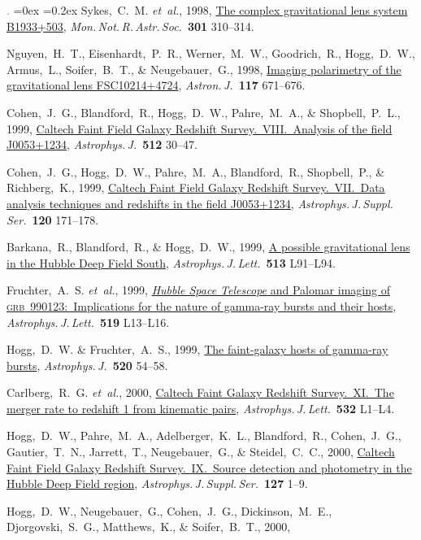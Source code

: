 \documentclass[12pt,letterpaper]{article}
\newcommand{\latin}[1]{\textsl{#1}}
\newcommand{\etal}{\latin{et~al.}}
\newcommand{\satellite}[1]{\textsl{#1}}
\newcommand{\doi}[2]{\href{http://dx.doi.org/#1}{{#2}}}
\newcommand{\deemph}[1]{\textcolor{grey}{\footnotesize{#1}}}
\newcommand{\pubnumber}[1]{\deemph{{#1}.}}
\newcounter{refpubnum}
\newcommand{\hogglist}{%
    \rightmargin=0in
    \leftmargin=0.18in
    \topsep=0ex
    \partopsep=0pt
    \itemsep=0.2ex
    \parsep=0pt
    \itemindent=-1.0\leftmargin
    \listparindent=0.0\leftmargin
    \settowidth{\labelsep}{~}
    \usecounter{refpubnum}
  }
\begin{document}
\begin{list}{\pubnumber{\therefpubnum}}{\hogglist}
Sykes,~C.~M. \etal, 1998,
\doi{10.1046/j.1365-8711.1998.02081.x}{The complex gravitational lens system B1933+503},
\textit{Mon.\,Not.\,R.\,Astr.\,Soc.}\ \textbf{301} 310--314.
\item
Nguyen,~H.~T., Eisenhardt,~P.~R., Werner,~M.~W., Goodrich,~R., Hogg,~D.~W., Armus,~L., Soifer,~B.~T., \& Neugebauer,~G., 1998,
\doi{10.1086/300742}{Imaging polarimetry of the gravitational lens FSC10214+4724},
\textit{Astron.\,J.}\ \textbf{117} 671--676.
\item
Cohen,~J.~G., Blandford,~R., Hogg,~D.~W., Pahre,~M.~A., \& Shopbell,~P.~L., 1999,
\doi{10.1086/306778}{Caltech Faint Field Galaxy Redshift Survey.\ VIII.\ Analysis of the field J0053+1234},
\textit{Astrophys.\,J.}\ \textbf{512} 30--47.
\item
Cohen,~J.~G., Hogg,~D.~W., Pahre,~M.~A., Blandford,~R., Shopbell,~P., \& Richberg,~K., 1999,
\doi{10.1086/313184}{Caltech Faint Field Galaxy Redshift Survey.\ VII.\ Data analysis techniques and redshifts in the field J0053+1234},
\textit{Astrophys.\,J.\,Suppl.\,Ser.}\ \textbf{120} 171--178.
\item
Barkana,~R., Blandford,~R., \& Hogg,~D.~W., 1999,
\doi{10.1086/311924}{A possible gravitational lens in the Hubble Deep Field South},
\textit{Astrophys.\,J.\,Lett.}\ \textbf{513} L91--L94.
\item
Fruchter,~A.~S. \etal, 1999,
\doi{10.1086/312094}{\satellite{Hubble Space Telescope} and Palomar imaging of \textsc{grb}~990123:\ Implications for the nature of gamma-ray bursts and their hosts},
\textit{Astrophys.\,J.\,Lett.}\ \textbf{519} L13--L16.
\item
Hogg,~D.~W. \& Fruchter,~A.~S., 1999,
\doi{10.1086/307457}{The faint-galaxy hosts of gamma-ray bursts},
\textit{Astrophys.\,J.}\ \textbf{520} 54--58.
\item
Carlberg,~R.~G. \etal, 2000,
\doi{10.1086/312560}{Caltech Faint Galaxy Redshift Survey.\ XI.\ The merger rate to redshift 1 from kinematic pairs},
\textit{Astrophys.\,J.\,Lett.}\ \textbf{532} L1--L4.
\item
Hogg,~D.~W., Pahre,~M.~A., Adelberger,~K.~L., Blandford,~R., Cohen,~J.~G., Gautier,~T.~N., Jarrett,~T., Neugebauer,~G., \& Steidel,~C.~C., 2000,
\doi{10.1086/313318}{Caltech Faint Field Galaxy Redshift Survey.\ IX.\ Source detection and photometry in the Hubble Deep Field region},
\textit{Astrophys.\,J.\,Suppl.\,Ser.}\ \textbf{127} 1--9.
\item
Hogg,~D.~W., Neugebauer,~G., Cohen,~J.~G., Dickinson,~M.~E., Djorgovski,~S.~G., Matthews,~K., \& Soifer,~B.~T., 2000,

\end{list}
\end{document}
